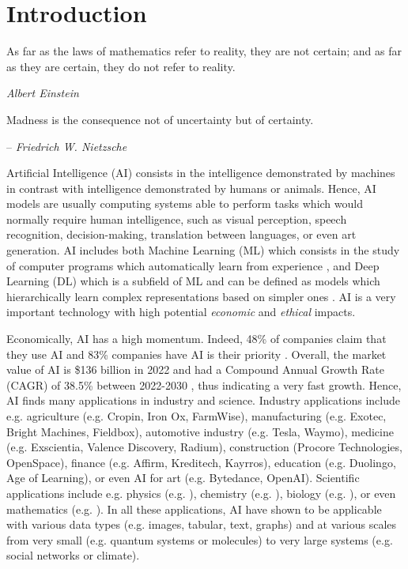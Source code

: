 \chapter{Introduction}
\label{chap:introduction}

\epigraph{As far as the laws of mathematics refer to reality, they are not certain; and as far as they are certain, they do not refer to reality.}{\textit{Albert Einstein}}

\epigraph{Madness is the consequence not of uncertainty but of certainty.}{-- \textit{Friedrich W. Nietzsche}}

Artificial Intelligence (AI) consists in the intelligence demonstrated by machines in contrast with intelligence demonstrated by humans or animals. 
Hence, AI models are usually computing systems able to perform tasks which would normally require human intelligence, such as visual perception, speech recognition, decision-making, translation between languages, or even art generation.
AI includes both Machine Learning (ML) which consists in the study of computer programs which automatically learn from experience \citep{Mitchell97}, and Deep Learning (DL) which is a subfield of ML and can be defined as models which hierarchically learn complex representations based on simpler ones \citep{GoodBengCour16}.
AI is a very important technology with high potential \emph{economic} and \emph{ethical} impacts. 

Economically, AI has a high momentum. Indeed, 48\% of companies claim that they use AI \cite{ai-market-oreilly} and 83\% companies have AI is their priority \cite{ai-market-forbes}. Overall, the market value of AI is \$136 billion in 2022 \cite{ai-market} and had a Compound Annual Growth Rate (CAGR) of 38.5\% between 2022-2030 \cite{ai-market}, thus indicating a very fast growth.
Hence, AI finds many applications in industry and science. 
Industry applications include e.g. agriculture (e.g. Cropin, Iron Ox, FarmWise), manufacturing (e.g. Exotec, Bright Machines, Fieldbox), automotive industry (e.g. Tesla, Waymo), medicine (e.g. Exscientia, Valence Discovery, Radium), construction (Procore Technologies, OpenSpace), finance (e.g. Affirm, Kreditech, Kayrros), education (e.g. Duolingo, Age of Learning), or even AI for art (e.g. Bytedance, OpenAI).
Scientific applications include e.g. physics (e.g. \cite{gao2022abinitio}), chemistry (e.g. \cite{huang2021abinitio}), biology (e.g. \cite{hetzel2022predicting}), or even mathematics (e.g. \cite{cobbe2021math}).
In all these applications, AI have shown to be applicable with various data types (e.g. images, tabular, text, graphs) and at various scales from very small (e.g. quantum systems or molecules) to very large systems (e.g. social networks or climate).

